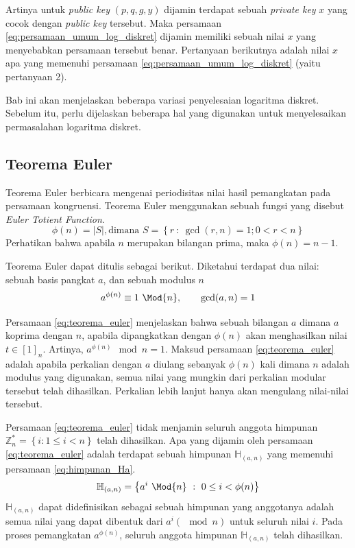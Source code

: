 Artinya untuk \textit{public key} $ (p, q, g, y) $ dijamin terdapat sebuah \textit{private key} $ x $ yang cocok dengan \textit{public key} tersebut. Maka persamaan \eqref{eq:persamaan_umum_log_diskret} dijamin memiliki sebuah nilai $ x $ yang menyebabkan persamaan tersebut benar. Pertanyaan berikutnya adalah nilai $ x $ apa yang memenuhi persamaan \eqref{eq:persamaan_umum_log_diskret} (yaitu pertanyaan 2).

Bab ini akan menjelaskan beberapa variasi penyelesaian logaritma diskret. Sebelum itu, perlu dijelaskan beberapa hal yang digunakan untuk menyelesaikan permasalahan logaritma diskret.

\subsection {Teorema Euler}

Teorema Euler berbicara mengenai periodisitas nilai hasil pemangkatan pada persamaan kongruensi. Teorema Euler menggunakan sebuah fungsi yang disebut \textit{Euler Totient Function}.\cite{stallings_cryptography}
\begin{equation}
\phi(n)=\left|S\right|, \text{dimana } S=\left\{r\ :\ \gcd (r,n)=1; 0 < r < n \right\}
\label{eq:euler_totient_function}
\end{equation}
Perhatikan bahwa apabila $ n $ merupakan bilangan prima, maka $ \phi(n)=n-1 $.

Teorema Euler dapat ditulis sebagai berikut. Diketahui terdapat dua nilai: sebuah basis pangkat $ a $, dan sebuah modulus $ n $
\begin{equation}
a^{\phi(n)}\equiv 1\ \Mod{n}, \qquad \gcd(a,n)=1
\label{eq:teorema_euler}
\end{equation}

Persamaan \eqref{eq:teorema_euler} menjelaskan bahwa sebuah bilangan $ a $ dimana $ a $ koprima dengan $ n $, apabila dipangkatkan dengan $ \phi(n) $ akan menghasilkan nilai $ t \in [1]_n $. Artinya, $ a^{\phi(n)}\mod{n}=1 $. Maksud persamaan \eqref{eq:teorema_euler} adalah apabila perkalian dengan $ a $ diulang sebanyak $ \phi(n) $ kali dimana $ n $ adalah modulus yang digunakan, semua nilai yang mungkin dari perkalian modular tersebut telah dihasilkan. Perkalian lebih lanjut hanya akan mengulang nilai-nilai tersebut.

Persamaan \eqref{eq:teorema_euler} tidak menjamin seluruh anggota himpunan $ \mathbb{Z}_n^{*}=\left\{ i : 1 \leq i < n\right\} $ telah dihasilkan. Apa yang dijamin oleh persamaan \eqref{eq:teorema_euler} adalah terdapat sebuah himpunan $ \mathbb{H}_{(a,n)} $ yang memenuhi persamaan \eqref{eq:himpunan_Ha}.
\begin{equation}
\mathbb{H}_{(a,n)}=\left\{a^{i}\ \Mod{n}\ :\ 0 \leq i < \phi(n) \right\}
\label{eq:himpunan_Ha}
\end{equation}
$ \mathbb{H}_{(a, n)} $ dapat didefinisikan sebagai sebuah himpunan yang anggotanya adalah semua nilai yang dapat dibentuk dari $ a^i (\mod{n}) $ untuk seluruh nilai $ i $. Pada proses pemangkatan $ a^{\phi(n)} $, seluruh anggota himpunan $ \mathbb{H}_{(a, n)} $ telah dihasilkan.

